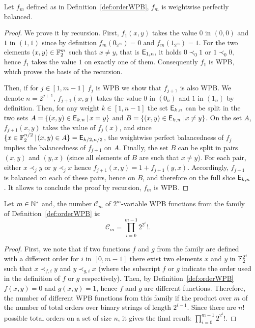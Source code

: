 \documentclass[11pt]{llncs}
\begin{document}
\begin{theorem}\label{thm:orderWPB}
	
	Let $f_m$ defined as in Definition~\ref{def:orderWPB}, $f_m$ is weightwise perfectly balanced.
	
\end{theorem}
\begin{proof}

We prove it by recursion. 
First, $f_1(x,y)$ takes the value $0$ in $(0,0)$ and $1$ in $(1,1)$ since by definition $f_m(0_{2^m})=0$ and $f_m(1_{2^m})=1$. 
For the two elements $(x,y)\in \mathbb{F}_2^m$ such that $x\ne y$, that is $\mathsf{E}_{1,n}$, it holds $0 \prec_0 1$ or $1 \prec_0 0$, hence $f_1$ takes the value $1$ on exactly one of them. 
Consequently $f_1$ is WPB, which proves the basis of the recursion.

Then, if for $j\in [1,m-1]$ $f_j$ is WPB we show that $f_{j+1}$ is also WPB. We denote $n=2^{j+1}$, $f_{j+1}(x,y)$ takes the value $0$ in $(0_n)$ and $1$ in $(1_n)$ by definition. Then, for any weight $k\in [1,n-1]$ the set $\mathsf{E}_{k,n}$ can be split in the two sets $A=\{(x,y)\in \mathsf{E}_{k,n} \,  | \, x=y\}$ and $B=\{(x,y)\in \mathsf{E}_{k,n} \,  | \, x\ne y\}$. 
On the set $A$, $f_{j+1}(x,y)$ takes the value of $f_{j}(x)$, and since $\{x\in \mathbb{F}_2^{n/2} \, | \, (x,y) \in A\}=\mathsf{E}_{k/2,n/2}$, the weightwise perfect balancedness of $f_{j}$ implies the balancedness of $f_{j+1}$ on $A$. 
Finally, the set $B$ can be split in pairs $(x,y)$ and $(y,x)$ (since all elements of $B$ are such that $x \ne y$). For each pair, either $x \prec_j y$ or $y \prec_j x$ hence $f_{j+1}(x,y)=1+f_{j+1}(y,x)$. Accordingly, $f_{j+1}$ is balanced on each of these pairs, hence on $B$, and therefore on the full slice $\mathsf{E}_{k,n}$.
It allows to conclude the proof by recursion, $f_m$ is WPB.



	
\end{proof}

\begin{proposition}\label{propo:const1count}
	Let $m\in \mathbb{N}^*$ and, the number $\mathcal{C}_m$ of $2^m$-variable WPB functions from the family of Definition~\ref{def:orderWPB} is:
	\[\mathcal{C}_m=\prod_{i=0}^{m-1} 2^{2^{i}}!.\]

\end{proposition}
\begin{proof}
First, we note that if two functions $f$ and $g$ from the family are defined with a different order for $i$ in $[0,m-1]$ there exist two elements $x$ and $y$ in $\mathbb{F}_2^{2^i}$ such that $x\prec_{f,i} y$ and $y\prec_{g,i} x$ (where the subscript $f$ or $g$ indicate the order used in the definition of $f$ or $g$ respectively). 
Then, by Definition~\ref{def:orderWPB} $f(x,y)=0$ and $g(x,y)=1$, hence $f$ and $g$ are different functions. 
Therefore, the number of different WPB functions from this family if the product over $m$ of the number of total orders over binary strings of length $2^{i-1}$. Since there are $n!$ possible total orders on a set of size $n$, it gives the final result: $\prod_{i=0}^{m-1} 2^{2^{i}}!$.



\end{proof}
\end{document}
